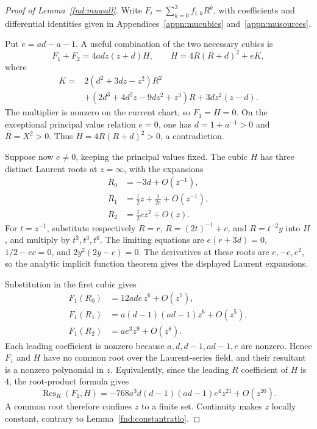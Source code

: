 \documentclass[11pt,a4paper]{article}
\numberwithin{equation}{section}
\theoremstyle{plain}
\theoremstyle{definition}
\theoremstyle{remark}
\begin{document}
\begin{proof}[Proof of Lemma~\ref{fnd:muwall}]
Write $F_i=\sum_{k=0}^3 f_{i,k}R^k$, with coefficients and differential
identities given in Appendices~\ref{appn:mucubics} and~\ref{appn:musources}.

Put $e=ad-a-1$.  A useful combination of the two necessary cubics is
\begin{equation}\label{fnd:mu-short-cubic}
 F_1+F_2=4adz(z+d)H,
 \qquad H=4R(R+d)^2+eK,
\end{equation}
where
\[
 \begin{aligned}
 K={}&2(d^2+3dz-z^2)R^2\\
 &+(2d^3+4d^2z-9dz^2+z^3)R
       +3dz^2(z-d).
 \end{aligned}
\]
The multiplier is nonzero on the current chart, so $F_1=H=0$.
On the exceptional principal value relation $e=0$, one has
$d=1+a^{-1}>0$ and $R=X^2>0$.  Thus $H=4R(R+d)^2>0$,
a contradiction.

Suppose now $e\ne0$, keeping the principal values fixed.  The cubic $H$ has
three distinct Laurent roots at $z=\infty$, with the expansions
\begin{equation}\label{fnd:mu-newton-roots}
 \begin{aligned}
 R_0&=-3d+O(z^{-1}),\\
 R_1&=\tfrac12z+\tfrac1{2e}+O(z^{-1}),\\
 R_2&=\tfrac12ez^2+O(z).
 \end{aligned}
\end{equation}
For $t=z^{-1}$, substitute respectively $R=r$,
$R=(2t)^{-1}+c$, and $R=t^{-2}y$ into $H$, and multiply by
$t^3,t^3,t^6$.  The limiting equations are
$e(r+3d)=0$, $1/2-ec=0$, and $2y^2(2y-e)=0$.
The derivatives at these roots are $e,-e,e^2$, so the analytic implicit
function theorem gives the displayed Laurent expansions.

Substitution in the first cubic gives
\begin{equation}\label{fnd:mu-newton-values}
 \begin{aligned}
 F_1(R_0)&=12ade\,z^6+O(z^5),\\
 F_1(R_1)&=a(d-1)(ad-1)z^6+O(z^5),\\
 F_1(R_2)&=ae^3z^9+O(z^8).
 \end{aligned}
\end{equation}
Each leading coefficient
is nonzero because $a,d,d-1,ad-1,e$ are nonzero.  Hence $F_1$ and $H$
have no common root over the Laurent-series field, and their resultant
is a nonzero polynomial in $z$.  Equivalently, since the leading
$R$ coefficient of $H$ is $4$, the root-product formula gives
\begin{equation}\label{fnd:mu-short-resultant}
 \operatorname{Res}_R(F_1,H)
 =-768a^3d(d-1)(ad-1)e^4z^{21}+O(z^{20}).
\end{equation}
A common root therefore confines
$z$ to a finite set.  Continuity makes $z$ locally constant, contrary
to Lemma~\ref{fnd:constantratio}.


\end{proof}
\end{document}
